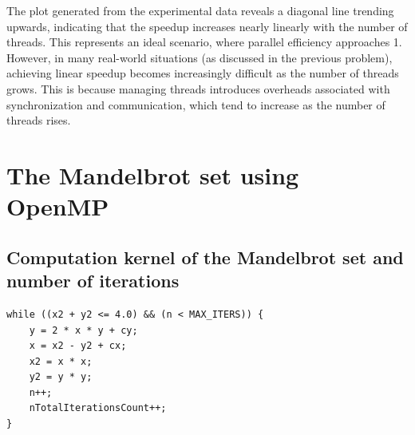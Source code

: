 \documentclass[unicode,11pt,a4paper,oneside,numbers=endperiod,openany]{scrartcl}
\begin{document}
The plot generated from the experimental data reveals a diagonal line trending upwards, indicating that the speedup increases nearly linearly with the number of threads. This represents an ideal scenario, where parallel efficiency approaches 1. However, in many real-world situations (as discussed in the previous problem), achieving linear speedup becomes increasingly difficult as the number of threads grows. This is because managing threads introduces overheads associated with synchronization and communication, which tend to increase as the number of threads rises.

\section{The Mandelbrot set using OpenMP }
\subsection{Computation kernel of the Mandelbrot set and number of iterations}
\begin{lstlisting}[language=MyC++, style=mystyle, caption={Mandelbrot Iteration Loop}]
while ((x2 + y2 <= 4.0) && (n < MAX_ITERS)) {
    y = 2 * x * y + cy;
    x = x2 - y2 + cx;
    x2 = x * x;
    y2 = y * y;
    n++;
    nTotalIterationsCount++;
}
\end{lstlisting}
\end{document}
